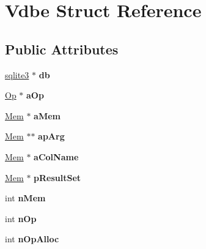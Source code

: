 \hypertarget{struct_vdbe}{\section{Vdbe Struct Reference}
\label{struct_vdbe}
}
\subsection*{Public Attributes}
\begin{DoxyCompactItemize}
\item 
\hypertarget{struct_vdbe_a495366101a593999f4d2ed905e839029}{\hyperlink{structsqlite3}{sqlite3} $\ast$ {\bfseries db}}\label{struct_vdbe_a495366101a593999f4d2ed905e839029}

\item 
\hypertarget{struct_vdbe_a1ba82f08947b275dd72a3e3095ad02d5}{\hyperlink{struct_vdbe_op}{Op} $\ast$ {\bfseries a\-Op}}\label{struct_vdbe_a1ba82f08947b275dd72a3e3095ad02d5}

\item 
\hypertarget{struct_vdbe_ac36776c53b6ec9054a2826ec83f29953}{\hyperlink{struct_mem}{Mem} $\ast$ {\bfseries a\-Mem}}\label{struct_vdbe_ac36776c53b6ec9054a2826ec83f29953}

\item 
\hypertarget{struct_vdbe_a74fd4612c55ac2fde475096a4d2605b5}{\hyperlink{struct_mem}{Mem} $\ast$$\ast$ {\bfseries ap\-Arg}}\label{struct_vdbe_a74fd4612c55ac2fde475096a4d2605b5}

\item 
\hypertarget{struct_vdbe_a900f557143e7d2ab8c560f7ada66d0f7}{\hyperlink{struct_mem}{Mem} $\ast$ {\bfseries a\-Col\-Name}}\label{struct_vdbe_a900f557143e7d2ab8c560f7ada66d0f7}

\item 
\hypertarget{struct_vdbe_a0dec47b8d8c481df2b73d5bbf9cdde11}{\hyperlink{struct_mem}{Mem} $\ast$ {\bfseries p\-Result\-Set}}\label{struct_vdbe_a0dec47b8d8c481df2b73d5bbf9cdde11}

\item 
\hypertarget{struct_vdbe_a10a19309607617a75d3722219d3c7615}{int {\bfseries n\-Mem}}\label{struct_vdbe_a10a19309607617a75d3722219d3c7615}

\item 
\hypertarget{struct_vdbe_a81e72e6812c71e13651f81cc3a6ca1d0}{int {\bfseries n\-Op}}\label{struct_vdbe_a81e72e6812c71e13651f81cc3a6ca1d0}

\item 
\hypertarget{struct_vdbe_aa52020050ea42e10ad8be8ebdf470850}{int {\bfseries n\-Op\-Alloc}}\label{struct_vdbe_aa52020050ea42e10ad8be8ebdf470850}


\end{DoxyCompactItemize}
